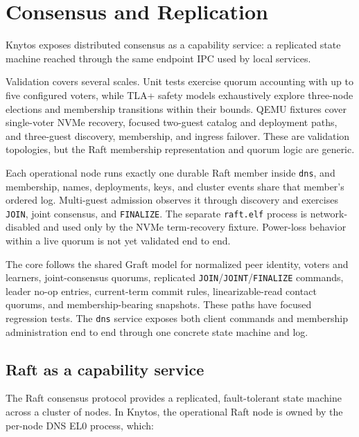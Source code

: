 \chapter{Consensus and Replication}
\label{chap:consensus}

Knytos exposes distributed consensus as a capability service: a replicated
state machine reached through the same endpoint IPC used by local services.

Validation covers several scales. Unit tests exercise quorum accounting with
up to five configured voters, while TLA+ safety models exhaustively explore
three-node elections and membership transitions within their bounds. QEMU
fixtures cover single-voter NVMe recovery, focused two-guest catalog and
deployment paths, and three-guest discovery, membership, and ingress failover.
These are validation topologies, but the Raft membership representation and quorum
logic are generic.

Each operational node runs exactly one durable Raft member inside
\texttt{dns}, and membership, names, deployments, keys, and cluster events share
that member's ordered log. Multi-guest admission observes it through discovery
and exercises \texttt{JOIN}, joint consensus, and \texttt{FINALIZE}. The separate
\texttt{raft.elf} process is network-disabled and used only by the NVMe
term-recovery fixture. Power-loss behavior within a live quorum is not yet
validated end to end.

The core follows the shared Graft model for
normalized peer identity, voters and learners, joint-consensus quorums,
replicated \texttt{JOIN}/\texttt{JOINT}/\texttt{FINALIZE} commands, leader
no-op entries, current-term commit rules, linearizable-read contact quorums,
and membership-bearing snapshots. These paths have focused regression tests. The
\texttt{dns} service exposes both client commands and membership
administration end to end through one concrete state machine and log.

\section{Raft as a capability service}

The Raft consensus protocol provides a replicated, fault-tolerant state machine
across a cluster of nodes. In Knytos, the operational Raft node is owned
by the per-node DNS EL0 process, which:

